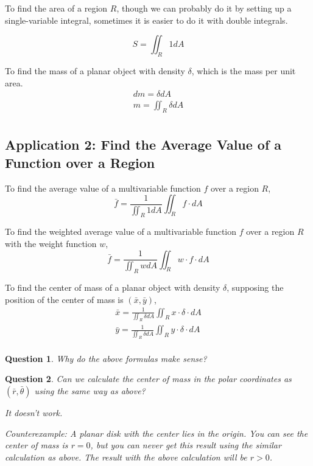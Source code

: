 \documentclass{article}
\newtheorem*{question}{Question}
\begin{document}
To find the area of a region $R$, though we can probably do it by setting up a 
single-variable integral, sometimes it is easier to do it with double integrals.

\begin{equation*}
  S = \iint_R 1 dA
\end{equation*}

To find the mass of a planar object with density $\delta$, which is the mass per 
unit area.
\begin{gather*}
  dm = \delta dA \\
  m = \iint_R \delta dA \\
\end{gather*}

\subsection{Application 2: Find the Average Value of a Function over a Region}

To find the average value of a multivariable function $f$ over a region $R$,
\begin{equation*}
  \bar{f} = \frac{1}{\iint_R 1 dA} \iint_R f \cdot dA
\end{equation*}

To find the weighted average value of a multivariable function $f$ over a region 
$R$ with the weight function $w$,
\begin{equation*}
  \bar{f} = \frac{1}{\iint_R w dA} \iint_R w \cdot f \cdot dA
\end{equation*}

To find the center of mass of a planar object with density $\delta$, supposing 
the position of the center of mass is $(\bar{x}, \bar{y})$,
\begin{gather*}
  \bar{x} = \frac{1}{\iint_R \delta dA}\iint_R x \cdot \delta \cdot dA \\
  \bar{y} = \frac{1}{\iint_R \delta dA}\iint_R y \cdot \delta \cdot dA \\
\end{gather*}

\begin{question}
  Why do the above formulas make sense?
\end{question}

\begin{question}
  Can we calculate the center of mass in the polar coordinates as 
  $(\bar{r}, \bar{\theta})$ using the same way as above?

  It doesn't work. 
  
  Counterexample: A planar disk with the center lies in the origin. You can see 
  the center of mass is $r = 0$, but you can never get this result using the 
  similar calculation as above. The result with the above calculation will be 
  $r > 0$.
\end{question}
\end{document}

